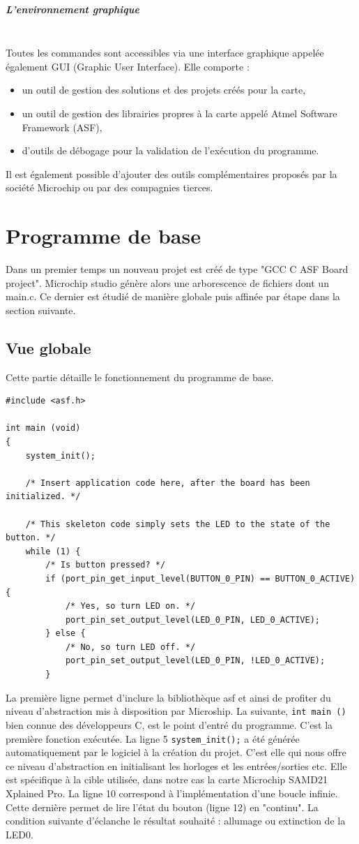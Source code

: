 \documentclass[a4paper]{article}
\begin{document}
	\subparagraph{L’environnement graphique}~~\\
	Toutes les commandes sont accessibles via une interface graphique appelée également GUI (Graphic User Interface). Elle comporte :
	\begin{itemize}
		\item un outil de gestion des solutions et des projets créés pour la carte,
		\item un outil de gestion des librairies propres à la carte appelé Atmel Software Framework (ASF),
		\item d’outils de débogage pour la validation de l’exécution du programme.
	\end{itemize}
	Il est également possible d’ajouter des outils complémentaires proposés par la société Microchip ou par des compagnies tierces.
	
\newpage

\section{Programme de base} %

Dans un premier temps un nouveau projet est créé de type "GCC C ASF Board project". Microchip studio génère alors une arborescence de fichiers dont un main.c. Ce dernier est étudié de manière globale puis affinée par étape dans la section suivante.

\subsection{Vue globale}
Cette partie détaille le fonctionnement du programme de base. 


\begin{lstlisting}[style=CStyle]
#include <asf.h>

int main (void)
{
	system_init();
	
	/* Insert application code here, after the board has been initialized. */
	
	/* This skeleton code simply sets the LED to the state of the button. */
	while (1) {
		/* Is button pressed? */
		if (port_pin_get_input_level(BUTTON_0_PIN) == BUTTON_0_ACTIVE) {
			/* Yes, so turn LED on. */
			port_pin_set_output_level(LED_0_PIN, LED_0_ACTIVE);
		} else {
			/* No, so turn LED off. */
			port_pin_set_output_level(LED_0_PIN, !LED_0_ACTIVE);
		}
	\end{lstlisting}
	La première ligne permet d'inclure la  bibliothèque asf et ainsi de profiter du niveau d'abstraction mis à disposition par Microship. La suivante, \texttt{int main ()} bien connue des développeurs C, est le point d'entré du programme. C'est la première fonction exécutée. La ligne 5 \texttt{system\_init();} a été générée automatiquement par le logiciel à la création du projet. C'est elle qui nous offre ce niveau d'abstraction en initialisant les horloges et les entrées/sorties etc. Elle est spécifique à la cible utilisée, dans notre cas la carte Microchip SAMD21 Xplained Pro. La ligne 10 correspond à l'implémentation d'une boucle infinie. Cette dernière permet de lire l'état du bouton (ligne 12) en "continu". La condition suivante d’éclanche le résultat souhaité : allumage ou extinction de la LED0.
	
\end{document}
